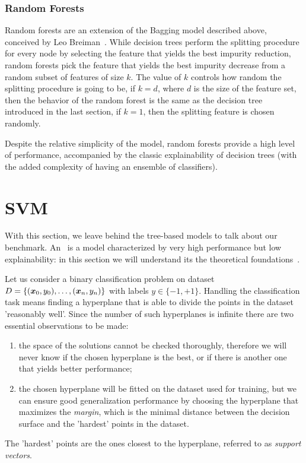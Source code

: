 \subsubsection{Random Forests}

Random forests are an extension of the Bagging model described above, conceived by Leo Breiman~\cite{Breiman2001}. While decision trees perform the splitting procedure for every node by selecting the feature that yields the best impurity reduction, random forests pick the feature that yields the best impurity decrease from a random subset of features of size $k$. The value of $k$ controls how random the splitting procedure is going to be, if $k = d$, where $d$ is the size of the feature set, then the behavior of the random forest is the same as the decision tree introduced in the last section, if $k = 1$, then the splitting feature is chosen randomly.

Despite the relative simplicity of the model, random forests provide a high level of performance,
accompanied by the classic explainability of decision trees (with the added complexity of
having an ensemble of classifiers).

\section{SVM}
\label{sec:svm}
With this section, we leave behind the tree-based models to talk about our benchmark. An
\svm\ is a model characterized by very high performance but low explainability: in this
section we will understand its the theoretical foundations~\cite{ZhouZhi-Hua2021ML}.

\smallskip

Let us consider a binary classification problem on dataset $D = \{(\boldsymbol{x}_0, y_0), \allowbreak\ldots\allowbreak, (\boldsymbol{x}_n, y_n)\}$ with labels $y \in \{-1, +1\}$.
Handling the classification task means finding a hyperplane that is able to divide the points in the
dataset 'reasonably well'. Since the number of such hyperplanes is infinite there are two
essential observations to be made:
\begin{enumerate}
	\item the space of the solutions cannot be checked thoroughly, therefore we will never know
	      if the chosen hyperplane is the best, or if there is another one that yields better
	      performance;
	\item the chosen hyperplane will be fitted on the dataset used for training, but we can
		ensure good generalization performance by choosing the hyperplane that maximizes the
		\emph{margin}, which is the minimal distance between the decision surface and the
		'hardest' points in the dataset.
\end{enumerate}
The 'hardest' points are the ones closest to the hyperplane, referred to as \emph{support vectors}.

